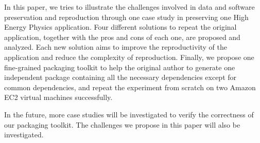 \documentclass{sig-alternate}
\begin{document}
In this paper, we tries to illustrate the challenges involved in data and software preservation and reproduction through one case study in preserving one High Energy Physics application.
Four different solutions to repeat the original application, together with the pros and cons of each one, are proposed and analyzed. Each new solution aims to improve the reproductivity of the application and reduce the complexity of reproduction. Finally, we propose one fine-grained packaging toolkit to help the original author to generate one independent package containing all the necessary dependencies except for common dependencies, and repeat the experiment from scratch on two Amazon EC2 virtual machines successfully.

In the future, more case studies will be investigated to verify the correctness of our packaging toolkit. The challenges we propose in this paper will also be investigated.



\end{document}
